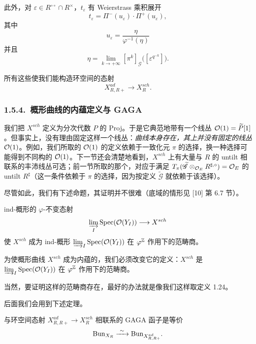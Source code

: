 此外，对 $\varepsilon\in R^{\circ\circ}\cap R^\times$，$t_\varepsilon$ 有 Weierstrass 乘积展开
\[
t_\varepsilon=\Pi^-(u_\varepsilon)\cdot\Pi^+(u_\varepsilon),
\]
其中
\[
u_\varepsilon=\frac{\eta}{\varphi^{-1}(\eta)}
\]
并且
\[
\eta=\lim_{k\to+\infty}[\pi^k]_{\mathscr{G}}\big([\varepsilon^{q^{-k}}]\big).
\]

所有这些使我们能构造环空间的态射
\[
X^{ad}_{R,R+}\longrightarrow X^{sch}_R .
\]


\subsubsection*{1.5.4.\ 概形曲线的内蕴定义与 GAGA}

我们把 $X^{sch}$ 定义为分次代数 $P$ 的 Proj。于是它典范地带有一个线丛 $\mathcal{O}(1)=\widetilde{P}[1]$。但事实上，没有理由固定这样一个线丛：\emph{曲线本身存在，其上并没有固定的线丛 $\mathcal{O}(1)$}。例如，我们所取的 $\mathcal{O}(1)$ 的定义依赖于一致化元 $\pi$ 的选择，换一种选择可能得到不同构的 $\mathcal{O}(1)$。下一节还会清楚地看到，$X^{sch}$ 上有大量与 $R$ 的 untilt 相联系的丰沛线丛可选；前一节所取的那个，对应于满足 $T_\pi(\widetilde{\mathscr{G}}\otimes_{\mathcal{O}_E}R^{\sharp,\circ})=\mathcal{O}_E$ 的 untilt $R^\sharp$（这一条件依赖于 $\pi$ 的选择，因为按定义 $\widetilde{\mathscr{G}}$ 就依赖于该选择）。

尽管如此，我们有下述命题，其证明并不很难（底域的情形见 [10] 第 6.7 节）。

\begin{proposition}\label{prop:1.27}
ind-概形的 $\varphi$-不变态射
\[
\varinjlim_{I}\operatorname{Spec}(\mathcal{O}(Y_I))\longrightarrow X^{sch}
\]
使 $X^{sch}$ 成为 ind-概形 $\varinjlim_I\operatorname{Spec}(\mathcal{O}(Y_I))$ 在 $\varphi^{\mathbb{Z}}$ 作用下的范畴商。
\end{proposition}

\begin{corollary}\label{cor:1.28}
为使概形曲线 $X^{sch}$ 成为内蕴的，我们必须改变它的定义：$X^{sch}$ 是 $\varinjlim_I\operatorname{Spec}(\mathcal{O}(Y_I))$ 在 $\varphi^{\mathbb{Z}}$ 作用下的范畴商。
\end{corollary}

当然，要证明这样的范畴商存在，最好的办法就是像我们这样取定义 1.24。

后面我们会用到下述定理。

\begin{theorem}[{[16]}]\label{thm:1.29}
与环空间态射 $X^{ad}_{R,R+}\to X^{sch}_R$ 相联系的 GAGA 函子是等价
\[
\Bun_{X_R}\xrightarrow{\ \sim\ }\Bun_{X^{ad}_{R,R+}}.
\]
\end{theorem}


